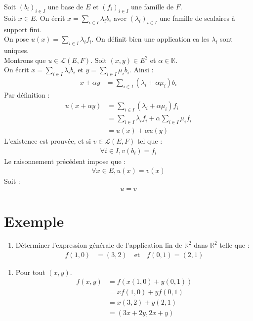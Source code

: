 \documentclass[../main.tex]{subfiles}
\begin{document}
\noindent Soit $(b_i)_{i\in I}$ une base de $E$ et $(f_i)_{i\in I}$ une famille de $F$. \\
Soit $x\in E$. On écrit $x = \sum\limits_{i\in I} \lambda_i b_i$ avec $(\lambda_i)_{i\in I}$ une famille de scalaires à support fini. \\
On pose $u(x) = \sum\limits_{i\in I} \lambda_i f_i$. On définit bien une application ca les $\lambda_i$ sont uniques. \\
Montrons que $u\in \mathcal{L}(E, F)$. Soit $(x, y) \in E^2$ et $\alpha \in \mathbb{K}$. \\
On écrit $x = \sum\limits_{i\in I} \lambda_i b_i$ et $y = \sum\limits_{i\in I} \mu_i b_i$. Ainsi : 
\begin{align*}
    x + \alpha y &= \sum_{i\in I} (\lambda_i + \alpha \mu_i) b_i
\end{align*}
Par définition : 
\begin{align*}
    u(x + \alpha y) &= \sum_{i\in I} (\lambda_i + \alpha \mu_i) f_i \\
    &= \sum_{i\in I} \lambda_i f_i + \alpha \sum_{i\in I} \mu_i f_i \\
    &= u(x) + \alpha u(y)
\end{align*}
L'existence est prouvée, et si $v\in \mathcal{L}(E, F)$ tel que : 
\begin{align*}
    \forall i \in I, v(b_i) = f_i
\end{align*}
Le raisonnement précédent impose que : 
\begin{align*}
    \forall x \in E, u(x) = v(x)
\end{align*}
Soit : 
\begin{align*}
    u = v
\end{align*}

\section{Exemple}
\begin{tcolorbox}[title=Exemple 21.64, title filled=false, colframe=darkgreen, colback=darkgreen!10!white]
    \begin{enumerate}
        \item Déterminer l'expression générale de l'application lin de $\mathbb{R}^2$ dans $\mathbb{R}^2$ telle que : 
        \begin{align*}
            f(1, 0) &= (3, 2) \quad \text{et} \quad f(0, 1) = (2, 1)
        \end{align*}
    \end{enumerate}
\end{tcolorbox}

\begin{enumerate}
    \item Pour tout $(x, y)$. 
    \begin{align*}
        f(x, y) &= f(x(1, 0) + y(0, 1)) \\
        &= xf(1, 0) + yf(0, 1) \\
        &= x(3, 2) + y(2, 1) \\
        &= (3x + 2y, 2x + y)
    \end{align*}
\end{enumerate}
\end{document}
